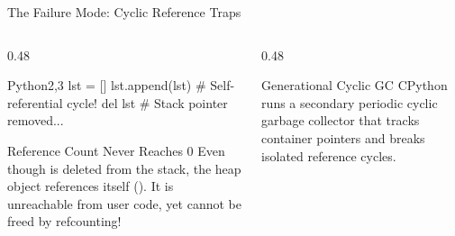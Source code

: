 \begin{frame}[fragile]{The Failure Mode: Cyclic Reference Traps}
  \begin{columns}[T,onlytextwidth]
    \begin{column}{0.48\textwidth}
      \begin{HighlightedCodeBlock}{Python}{2,3}
lst = []
lst.append(lst) # Self-referential cycle!
del lst         # Stack pointer removed...
      \end{HighlightedCodeBlock}
      \vspace{0.10cm}
      \begin{WarningBox}{Reference Count Never Reaches 0}
        \scriptsize
        Even though  is deleted from the stack, the heap object references itself (). It is unreachable from user code, yet cannot be freed by refcounting!
      \end{WarningBox}
    \end{column}
    \begin{column}{0.48\textwidth}
      \begin{center}
      \end{center}
      \begin{ConceptBox}{Generational Cyclic GC}
        \scriptsize CPython runs a secondary periodic cyclic garbage collector that tracks container pointers and breaks isolated reference cycles.
      \end{ConceptBox}
    \end{column}
  \end{columns}
\end{frame}

